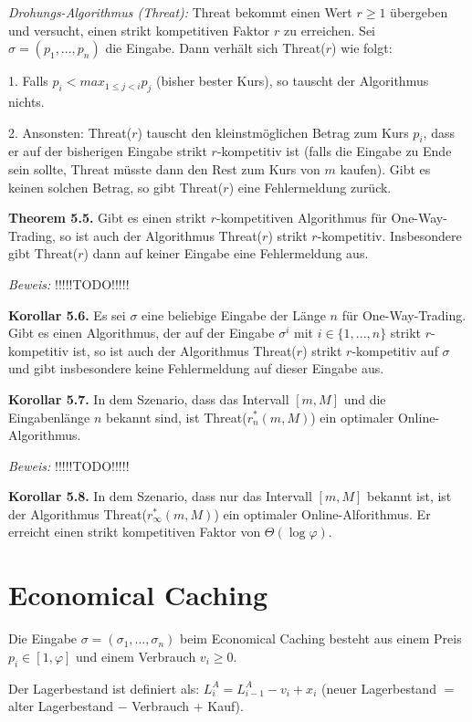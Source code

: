 \textit{Drohungs-Algorithmus (Threat):} Threat bekommt einen Wert $r \ge 1$ übergeben und versucht, einen strikt kompetitiven Faktor $r$ zu erreichen. Sei $\sigma = (p_{1}, ..., p_{n})$ die Eingabe. Dann verhält sich Threat($r$) wie folgt:

1. Falls $p_{i} < max_{1 \le j < i}p_{j}$ (bisher bester Kurs), so tauscht der Algorithmus nichts.

2. Ansonsten: Threat($r$) tauscht den kleinstmöglichen Betrag zum Kurs $p_{i}$, dass er auf der bisherigen Eingabe strikt $r$-kompetitiv ist (falls die Eingabe zu Ende sein sollte, Threat müsste dann den Rest zum Kurs von $m$ kaufen). Gibt es keinen solchen Betrag, so gibt Threat($r$) eine Fehlermeldung zurück.

\textbf{Theorem 5.5.} Gibt es einen strikt $r$-kompetitiven Algorithmus für One-Way-Trading, so ist auch der Algorithmus Threat($r$) strikt $r$-kompetitiv. Insbesondere gibt Threat($r$) dann auf keiner Eingabe eine Fehlermeldung aus.

\textit{Beweis:} !!!!!TODO!!!!!

\textbf{Korollar 5.6.} Es sei $\sigma$ eine beliebige Eingabe der Länge $n$ für One-Way-Trading. Gibt es einen Algorithmus, der auf der Eingabe $\sigma^{i}$ mit $i \in \{1, ..., n\}$ strikt $r$-kompetitiv ist, so ist auch der Algorithmus Threat($r$) strikt $r$-kompetitiv auf $\sigma$ und gibt insbesondere keine Fehlermeldung auf dieser Eingabe aus.

\textbf{Korollar 5.7.} In dem Szenario, dass das Intervall $[m, M]$ und die Eingabenlänge $n$ bekannt sind, ist Threat($r_{n}^{*}(m, M)$) ein optimaler Online-Algorithmus.

\textit{Beweis:} !!!!!TODO!!!!!

\textbf{Korollar 5.8.} In dem Szenario, dass nur das Intervall $[m, M]$ bekannt ist, ist der Algorithmus Threat($r_{\infty}^{*}(m, M)$) ein optimaler Online-Alforithmus. Er erreicht einen strikt kompetitiven Faktor von $\Theta(\log \varphi)$.

\section{Economical Caching}

Die Eingabe $\sigma = (\sigma_{1}, ..., \sigma_{n})$ beim Economical Caching besteht aus einem Preis $p_{i} \in [1, \varphi]$ und einem Verbrauch $v_{i} \ge 0$.

Der Lagerbestand ist definiert als: $L_{i}^{A} = L_{i-1}^{A} - v_{i} + x_{i}$ (neuer Lagerbestand $=$ alter Lagerbestand $-$ Verbrauch $+$ Kauf).

